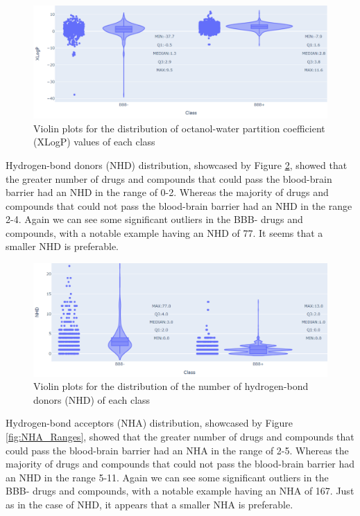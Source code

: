 \begin{figure}[!ht]
    \centering
    \includegraphics[width=0.9\linewidth]{images/XLogP Ranges.pdf}    

    \caption{Violin plots for the distribution of octanol-water partition coefficient (XLogP) values of each class}

    \label{fig:XLogP_Ranges} 
\end{figure}

Hydrogen-bond donors (NHD) distribution, showcased by Figure \ref{fig:NHD_Ranges}, showed that the greater number of drugs and compounds that could pass the blood-brain barrier had an NHD in the range of 0-2. Whereas the majority of drugs and compounds that could not pass the blood-brain barrier had an NHD in the range 2-4. Again we can see some significant outliers in the BBB- drugs and compounds, with a notable example having an NHD of 77. It seems that a smaller NHD is preferable.

\begin{figure}[!ht]
    \centering
    \includegraphics[width=0.9\linewidth]{images/NHD Ranges.pdf}    

    \caption{Violin plots for the distribution of the number of hydrogen-bond donors (NHD) of each class}

    \label{fig:NHD_Ranges} 
\end{figure}

Hydrogen-bond acceptors (NHA) distribution, showcased by Figure \ref{fig:NHA_Ranges}, showed that the greater number of drugs and compounds that could pass the blood-brain barrier had an NHA in the range of 2-5. Whereas the majority of drugs and compounds that could not pass the blood-brain barrier had an NHD in the range 5-11. Again we can see some significant outliers in the BBB- drugs and compounds, with a notable example having an NHA of 167. Just as in the case of NHD, it appears that a smaller NHA is preferable.

